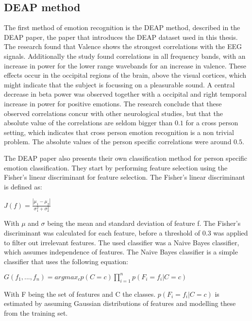 \subsection{DEAP method}
The first method of emotion recognition is the DEAP method, described in the DEAP paper\citep{DEAP}, the paper that introduces the DEAP dataset used in this thesis. The research found that Valence shows the strongest correlations with the EEG signals. Additionally the study found correlations in all frequency bands, with an increase in power for the lower range wavebands for an increase in valence. These effects occur in the occipital regions of the brain, above the visual cortices, which might indicate that the subject is focussing on a pleasurable sound. A central decrease in beta power was observed together with a occipital and right temporal increase in power for positive emotions. The research conclude that these observed correlations concur with other neurological studies, but that the absolute value of the correlations are seldom bigger than $0.1$ for a cross person setting, which indicates that cross person emotion recognition is a non trivial problem. The absolute values of the person specific correlations were around $0.5$.

\npar

The DEAP paper also presents their own classification method for person specific emotion classification. They start by performing feature selection using the Fisher's linear discriminant for feature selection. The Fisher's linear discriminant is defined as:

\begin{center}
$J(f) = \frac{|\mu_1 - \mu_2|}{\sigma_1^2 + \sigma_2^2}$ \
\end{center}

With $\mu$ and $\sigma$ being the mean and standard deviation of feature f. The Fisher's discriminant was calculated for each feature, before a threshold of 0.3 was applied to filter out irrelevant features. The used classifier was a Naive Bayes classifier, which assumes independence of features. The Naive Bayes classifier is a simple classifier that uses the following equation:

\begin{center}
$G(f_1, ..., f_n) = argmax_c p(C=c) \prod\limits_{i=1}^n p(F_i=f_i|C=c)$ \\
\end{center}

With F being the set of features and C the classes. $p(F_i=f_i|C=c)$ is estimated by assuming Gaussian distributions of features and modelling these from the training set.

